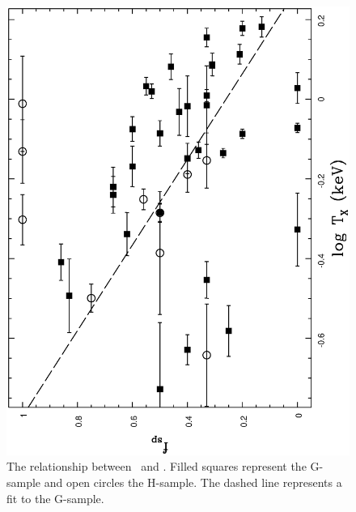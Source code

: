 \documentclass[usenatbib]{mn2e}
\begin{document}
\begin{figure}
  \begin{minipage}{241pt}
  \centering
  
    \includegraphics[height=\linewidth,angle=270]{fig_22.ps}
    \caption{The relationship between \fsp\ and \TX.  Filled squares
             represent the G-sample and open circles the H-sample.  The dashed
             line represents a fit to the G-sample.}
     \label{fig_fsp_TX}

  \end{minipage}\hspace{18pt}
  \begin{minipage}{241pt}
  \centering


\end{minipage}
\end{figure}
\end{document}
